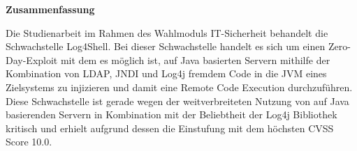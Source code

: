 
\textbf{\large Zusammenfassung}
\begin{justify}
Die Studienarbeit im Rahmen des Wahlmoduls IT-Sicherheit behandelt die Schwachstelle Log4Shell.
Bei dieser Schwachstelle handelt es sich um einen Zero-Day-Exploit mit dem es möglich ist, auf Java basierten
Servern mithilfe der Kombination von LDAP, JNDI und Log4j fremdem Code in die JVM eines Zielsystems zu
injizieren und damit eine Remote Code Execution durchzuführen.
Diese Schwachstelle ist gerade wegen der weitverbreiteten
Nutzung von auf Java basierenden Servern in Kombination mit der Beliebtheit der Log4j Bibliothek kritisch und erhielt aufgrund dessen die Einstufung
mit dem höchsten CVSS Score 10.0.
\end{justify}

